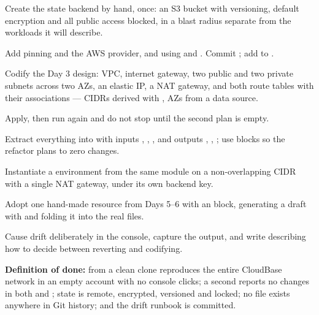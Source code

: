 \begin{buildalong}
\begin{wbitem}
  \item Create the state backend by hand, once: an S3 bucket with versioning, default encryption and all public access blocked, in a blast radius separate from the workloads it will describe.
  \item Add  pinning  and the AWS provider, and  using  and . Commit ; add  to .
  \item Codify the Day 3 design: VPC, internet gateway, two public and two private subnets across two AZs, an elastic IP, a NAT gateway, and both route tables with their associations --- CIDRs derived with , AZs from a data source.
  \item Apply, then run  again and do not stop until the second plan is empty.
  \item Extract everything into  with inputs , , ,  and outputs , , ; use  blocks so the refactor plans to zero changes.
  \item Instantiate a  environment from the same module on a non-overlapping CIDR with a single NAT gateway, under its own backend key.
  \item Adopt one hand-made resource from Days 5--6 with an  block, generating a draft with  and folding it into the real files.
  \item Cause drift deliberately in the console, capture the  output, and write  describing how to decide between reverting and codifying.
\end{wbitem}
\smallskip\textbf{Definition of done:}  from a clean clone reproduces the entire CloudBase network in an empty account with no console clicks; a second  reports no changes in both  and ; state is remote, encrypted, versioned and locked; no  file exists anywhere in Git history; and the drift runbook is committed.
\end{buildalong}


